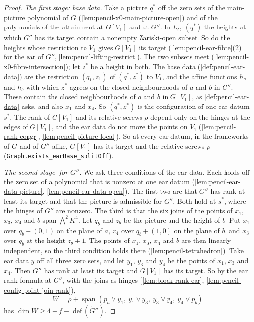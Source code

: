 \begin{proof}
  \emph{The first stage: base data.} Take a picture $q^*$ off the zero
  sets of the main-picture polynomial of $G$
  (\cref{lem:pencil-x0-main-picture-open}) and of the polynomials of the
  attainment at $G[V_1]$ and at $G''$. In $L_{G''}(q^*)$ the heights at
  which $G''$ has its target contain a nonempty Zariski-open subset. So
  do the heights whose restriction to $V_1$ gives $G[V_1]$ its target
  (\cref{lem:pencil-ear-fibre}(2) for the ear of $G''$,
  \cref{lem:pencil-lifting-restrict}). The two subsets meet
  (\cref{lem:pencil-x0-fibre-intersection}); let $z^*$ be a height in
  both. The base data (\cref{def:pencil-ear-data}) are the restriction
  $(q_1, z_1)$ of $(q^*, z^*)$ to $V_1$, and the affine functions $h_a$
  and $h_b$ with which $z^*$ agrees on the closed neighbourhoods of $a$
  and $b$ in $G''$. These contain the closed neighbourhoods of $a$ and
  $b$ in $G[V_1]$, as \cref{def:pencil-ear-data} asks, and also $x_1$ and
  $x_4$. So $(q^*, z^*)$ is the configuration of one ear datum $s^*$. The
  rank of $G[V_1]$ and its relative screws $\rho$ depend only on the
  hinges at the edges of $G[V_1]$, and the ear data do not move the points
  on $V_1$ (\cref{lem:pencil-rank-congr},
  \cref{lem:pencil-picture-local}). So at every ear datum, in the
  frameworks of $G$ and of $G''$ alike, $G[V_1]$ has its target and the
  relative screws $\rho$ (\texttt{Graph.exists\_earBase\_splitOff}).

  \emph{The second stage, for $G''$.} We ask three conditions of the ear
  data. Each holds off the zero set of a polynomial that is nonzero at
  one ear datum (\cref{lem:pencil-ear-data-picture},
  \cref{lem:pencil-ear-data-open}). The first two are that $G''$ has rank
  at least its target and that the picture is admissible for $G''$. Both
  hold at $s^*$, where the hinges of $G''$ are nonzero. The third is that
  the six joins of the points of $x_1$, $x_3$, $x_4$ and $b$ span
  $\bigwedge^2 K^4$. Let $q_b$ and $z_b$ be the picture and the height of
  $b$. Put $x_1$ over $q_b + (0, 1)$ on the plane of $a$, $x_4$ over
  $q_b + (1, 0)$ on the plane of $b$, and $x_3$ over $q_b$ at the height
  $z_b + 1$. The points of $x_1$, $x_3$, $x_4$ and $b$ are then linearly
  independent, so the third condition holds there
  (\cref{lem:pencil-tetrahedron}). Take ear data $y$ off all three zero
  sets, and let $y_1$, $y_3$ and $y_4$ be the points of $x_1$, $x_3$ and
  $x_4$. Then $G''$ has rank at least its target and $G[V_1]$ has its
  target. So by the ear rank formula at $G''$, with the joins as hinges
  (\cref{lem:block-rank-ear}, \cref{lem:pencil-config-point-join-rank}),
  \[
    W = \rho + \operatorname{span}(p_a \vee y_1,\ y_1 \vee y_3,\
    y_3 \vee y_4,\ y_4 \vee p_b)
  \]
  has $\dim W \ge 4 + f - \operatorname{def}(\tilde G'')$.


\end{proof}
